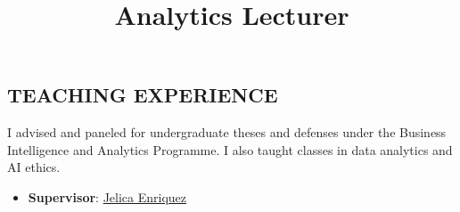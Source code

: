 \documentclass[margin]{res}
\begin{document}
\begin{resume}
\section{TEACHING EXPERIENCE}
\title{\textbf{Analytics Lecturer}}
\begin{position}
I advised and paneled for undergraduate theses and defenses under the Business Intelligence and Analytics Programme. I also taught classes in data analytics and AI ethics.
\begin{itemize}
    \item \textbf{Supervisor}: \href{https://scholar.google.com/citations?user=75JpdEcAAAAJ&hl=en}{Jelica Enriquez}
\end{itemize}
\end{position}


\end{resume}
\end{document}
